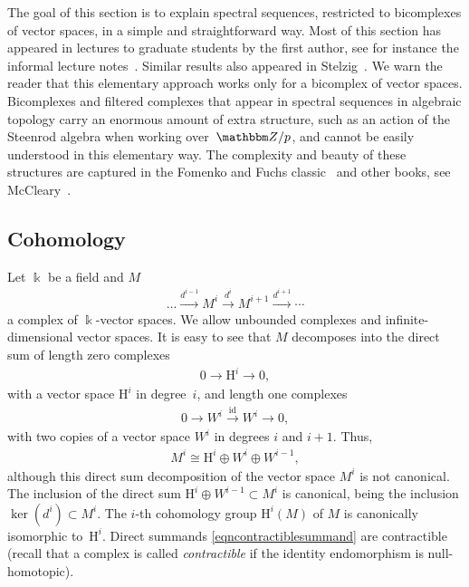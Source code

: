 \documentclass[pdftex]{sigma}
\theoremstyle{definition}
\numberwithin{equation}{section}
\def\Z{{\mathbbm Z}}
\def\lra{{\longrightarrow}}
\newcommand{\mH}{\mathrm{H}} %
\begin{document}
The goal of this section is to explain spectral sequences, restricted to
bicomplexes of vector spaces, in a simple and straightforward way. Most of this section has appeared in lectures to graduate students by the first author, see for instance the informal lecture notes~\cite{Kh-2010}. Similar results also appeared in Stelzig~\cite{St-2018}. We warn the reader that this elementary approach works only for a bicomplex of vector spaces. Bicomplexes and filtered complexes that appear in spectral sequences in algebraic topology carry an enormous amount of extra structure, such as an action of the Steenrod algebra when working over~$\Z/p$, and cannot be easily understood in this elementary way. The complexity and beauty of these structures are captured in the Fomenko and Fuchs classic~\cite{FF} and other books, see McCleary~\cite{McCleary}.

\subsection{Cohomology}
Let $\Bbbk$ be a field and $M$
\begin{gather*} \dots \stackrel{d^{i-1}}{\lra} M^i \stackrel{d^i}{\lra} M^{i+1} \stackrel{d^{i+1}}{\lra} \cdots \end{gather*}
a complex of $\Bbbk$-vector spaces. We allow unbounded complexes and infinite-dimensional
vector spaces. It is easy to see that $M$ decomposes into
the direct sum of length zero complexes
\begin{gather*} %
0 \lra \mH^i \lra 0,
\end{gather*}
with a vector space $\mH^i$ in degree~$i$, and length one complexes
\begin{gather}\label{eqncontractiblesummand}
 0 \lra W^i \stackrel{\mathrm{id}}{\lra} W^i \lra 0,
\end{gather}
with two copies of a vector space $W^i$ in degrees $i$ and $i+1$. Thus,
 \begin{gather*} M^i \cong \mH^i \oplus W^i \oplus W^{i-1},\end{gather*}
although this direct sum decomposition of the vector space $M^i$ is not canonical. The
inclusion of the direct sum $\mH^i \oplus W^{i-1} \subset M^i$ is canonical, being
the inclusion $\operatorname{ker}(d^i) \subset M^i$.
The $i$-th cohomology group $\mH^i(M)$ of $M$ is canonically isomorphic to~$\mH^i$. Direct summands \eqref{eqncontractiblesummand} are contractible (recall that a complex is called \emph{contractible} if the identity endomorphism is null-homotopic).
\end{document}
